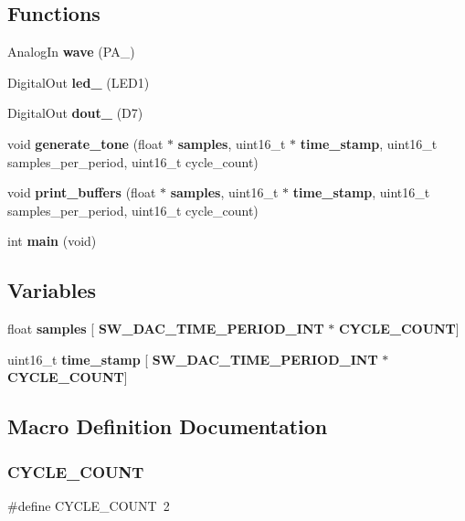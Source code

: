 \subsection*{Functions}
\begin{DoxyCompactItemize}
\item 
Analog\+In \textbf{ wave} (P\+A\+\_)
\item 
Digital\+Out \textbf{ led\+\_} (L\+E\+D1)
\item 
Digital\+Out \textbf{ dout\+\_} (D7)
\item 
void \textbf{ generate\+\_\+tone} (float $\ast$\textbf{ samples}, uint16\+\_\+t $\ast$\textbf{ time\+\_\+stamp}, uint16\+\_\+t samples\+\_\+per\+\_\+period, uint16\+\_\+t cycle\+\_\+count)
\item 
void \textbf{ print\+\_\+buffers} (float $\ast$\textbf{ samples}, uint16\+\_\+t $\ast$\textbf{ time\+\_\+stamp}, uint16\+\_\+t samples\+\_\+per\+\_\+period, uint16\+\_\+t cycle\+\_\+count)
\item 
int \textbf{ main} (void)
\end{DoxyCompactItemize}
\subsection*{Variables}
\begin{DoxyCompactItemize}
\item 
float \textbf{ samples} [\textbf{ S\+W\+\_\+\+D\+A\+C\+\_\+\+T\+I\+M\+E\+\_\+\+P\+E\+R\+I\+O\+D\+\_\+\+I\+NT} $\ast$\textbf{ C\+Y\+C\+L\+E\+\_\+\+C\+O\+U\+NT}]
\item 
uint16\+\_\+t \textbf{ time\+\_\+stamp} [\textbf{ S\+W\+\_\+\+D\+A\+C\+\_\+\+T\+I\+M\+E\+\_\+\+P\+E\+R\+I\+O\+D\+\_\+\+I\+NT} $\ast$\textbf{ C\+Y\+C\+L\+E\+\_\+\+C\+O\+U\+NT}]
\end{DoxyCompactItemize}


\subsection{Macro Definition Documentation}
\mbox{\label{main_8cpp_a0e115f49dba66626f975b86a6b14c0d4}} 
\subsubsection{CYCLE\_COUNT}
{\footnotesize\ttfamily \#define C\+Y\+C\+L\+E\+\_\+\+C\+O\+U\+NT~2}



